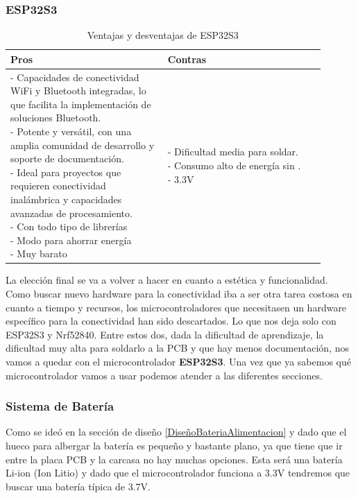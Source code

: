 \subsubsection{ESP32S3}
\begin{table}[H]
\centering
\small
\begin{tabular}{|p{0.45\linewidth}|p{0.45\linewidth}|}
\hline
\textbf{Pros} &
\textbf{Contras} \\
\hline
\parbox[t]{\linewidth}{
\vspace{0.1cm}
- Capacidades de conectividad \gls{WiFi} y \gls{Bluetooth} integradas, lo que facilita la implementación de soluciones \gls{Bluetooth}. \medskip \\
- Potente y versátil, con una amplia comunidad de desarrollo y soporte de documentación. \medskip \\
- Ideal para proyectos que requieren conectividad inalámbrica y capacidades avanzadas de procesamiento. \medskip \\
- Con todo tipo de librerías \medskip \\
- Modo  para ahorrar energía \medskip \\
- Muy barato \vspace{0.3cm}
} &
\parbox[t]{\linewidth}{
\vspace{0.1cm}
- Dificultad media para soldar. \medskip \\
- Consumo alto de energía sin . \medskip \\
- 3.3V } \medskip \\
\hline
\end{tabular}
\caption{Ventajas y desventajas de ESP32S3}
\end{table}

La elección final se va a volver a hacer en cuanto a estética y funcionalidad. Como buscar nuevo hardware para la conectividad  iba a ser otra tarea costosa en cuanto a tiempo y recursos, los microcontroladores que necesitasen un hardware específico para la conectividad han sido descartados.
Lo que nos deja solo con ESP32S3 y Nrf52840. Entre estos dos, dada la dificultad de aprendizaje, la dificultad muy alta para soldarlo a la \gls{PCB} y que hay menos documentación, nos vamos a quedar con el microcontrolador \textbf{ESP32S3}. Una vez que ya sabemos qué microcontrolador vamos a usar podemos atender a las diferentes secciones.

\subsubsection{Sistema de Batería} \label{InvestigacionSistemaBateria}
Como se ideó en la sección de diseño \ref{DiseñoBateriaAlimentacion} y dado que el hueco para albergar la batería es pequeño y bastante plano, ya que tiene que ir entre la placa \gls{PCB} y la carcasa no hay muchas opciones. Esta será una batería Li-ion (Ion Litio) y dado que el microcontrolador funciona a 3.3V tendremos que buscar una batería típica de 3.7V.

